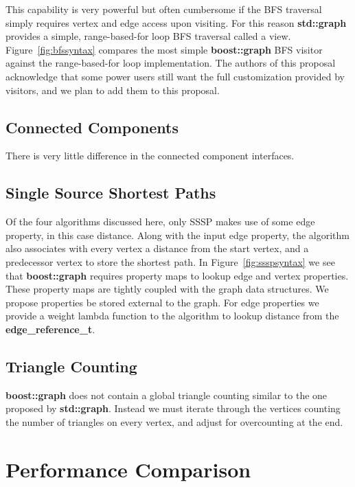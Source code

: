 This capability is very powerful but often cumbersome if the BFS traversal
simply requires vertex and edge access upon visiting.
For this reason \textbf{std::graph} provides a simple, range-based-for loop BFS traversal
called a view.
Figure~\ref{fig:bfssyntax} compares the most simple \textbf{boost::graph}
BFS visitor against the range-based-for loop implementation.
The authors of this proposal acknowledge that some power users still want
the full customization provided by visitors,
and we plan to add them to this proposal.

\subsection{Connected Components}
There is very little difference in the connected component interfaces.

\subsection{Single Source Shortest Paths}
Of the four algorithms discussed here, only SSSP makes use of some
edge property, in this case distance.
Along with the input edge property, the algorithm also associates with
every vertex a distance from the start vertex, and a predecessor
vertex to store the shortest path.
In Figure~\ref{fig:ssspsyntax} we see that \textbf{boost::graph} requires
property maps to lookup edge and vertex properties.
These property maps are tightly coupled with the graph data structures.
We propose properties be stored external to the graph.
For edge properties we provide a weight lambda function to the algorithm
to lookup distance from the \textbf{edge\_reference\_t}.

\subsection{Triangle Counting}
\textbf{boost::graph} does not contain a global triangle counting
similar to the one proposed by \textbf{std::graph}.
Instead we must iterate through the vertices counting the number of triangles
on every vertex, and adjust for overcounting at the end.

\clearpage

\section{Performance Comparison} \label{performance}

